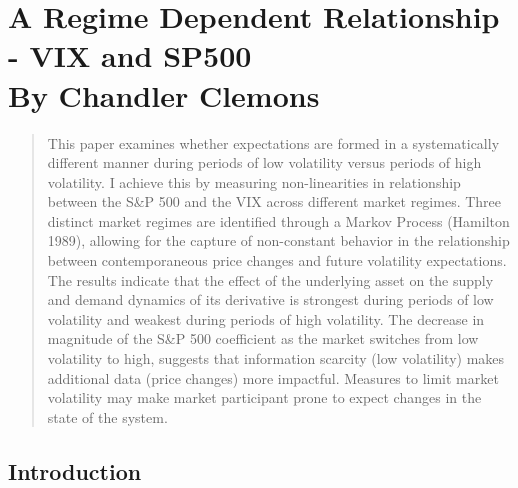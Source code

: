 \documentclass[11pt,a4paper,oldfontcommands]{memoir}
\begin{document}
\chapter{A Regime Dependent Relationship - VIX and SP500  \\ \small By Chandler Clemons}
\setcounter{page}{1}

\begin{abstract}
This paper examines whether expectations are formed in a systematically different manner during periods of low volatility versus periods of high volatility. I achieve this by measuring non-linearities in relationship between the S&P 500 and the VIX across different market regimes. Three distinct market regimes are identified through a Markov Process (Hamilton 1989), allowing for the capture of non-constant behavior in the relationship between contemporaneous price changes and future volatility expectations. The results indicate that the effect of the underlying asset on the supply and demand dynamics of its derivative is strongest during periods of low volatility and weakest during periods of high volatility. The decrease in magnitude of the S&P 500 coefficient as the market switches from low volatility to high, suggests that information scarcity (low volatility) makes additional data (price changes) more impactful. Measures to limit market volatility may make market participant prone to expect changes in the state of the system.




\end{abstract}
\clearpage

\section{Introduction}

\end{document}
